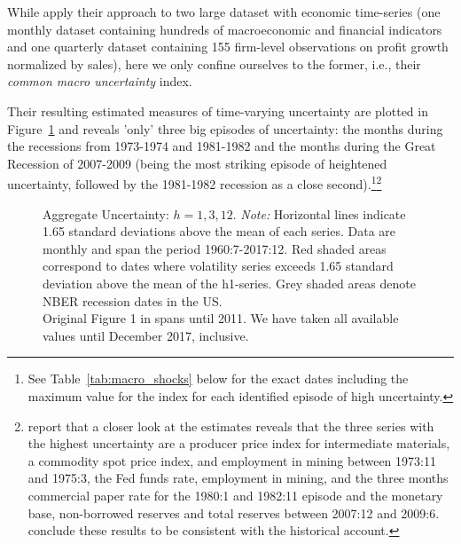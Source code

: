 \documentclass[a4paper,11pt,listof=nochaptergap,oneside,pointednumbers,bibtotoc,bigheadings,liststotoc]{scrbook}
\theoremstyle{mysatz}
\theoremstyle{mydefinition}
\theoremstyle{mybemerkung}
\begin{document}
While \citet{juradoetal:15} apply their approach to two large dataset with economic time-series (one monthly dataset containing hundreds of macroeconomic and financial indicators and one quarterly dataset containing 155 firm-level observations on profit growth normalized by sales), here we only confine ourselves to the former, i.e., their \textit{common macro uncertainty} index.

Their resulting estimated measures of time-varying uncertainty are plotted in Figure~\ref{fig:macroUncertainty_index} and reveals 'only' three big episodes of uncertainty: the months during the recessions from 1973-1974 and 1981-1982 and the months during the Great Recession of 2007-2009 (being the most striking episode of heightened uncertainty, followed by the 1981-1982 recession as a close second).\footnote{See Table~\ref{tab:macro_shocks} below for the exact dates including the maximum value for the index for each identified episode of high uncertainty.}\footnote{\citet{juradoetal:15} report that a closer look at the estimates reveals that the three series with the highest uncertainty are a producer price index for intermediate materials, a commodity spot price index, and employment in mining between 1973:11 and 1975:3, the Fed funds rate, employment in mining, and the three months commercial paper rate for the 1980:1 and 1982:11 episode and the monetary base, non-borrowed reserves and total reserves between 2007:12 and 2009:6. \citet{juradoetal:15} conclude these results to be consistent with the historical account.}

\begin{figure}[!ht]
   \centering
   \setlength\fboxsep{0pt}
   \setlength\fboxrule{0pt}
      \caption[Aggregate Uncertainty: $h = 1, 3, 12$.]{Aggregate Uncertainty: $h = 1, 3, 12$.
      \textit{Note:} Horizontal lines indicate 1.65 standard deviations above the mean of each series. Data are monthly and span the period 1960:7-2017:12. Red shaded areas correspond to dates where volatility series exceeds 1.65 standard deviation above the mean of the h1-series. Grey shaded areas denote NBER recession dates in the US.\\
      Original Figure 1 in \citet{juradoetal:15} spans until 2011. We have taken all available values until December 2017, inclusive.}   \label{fig:macroUncertainty_index}
\end{figure}
\end{document}
